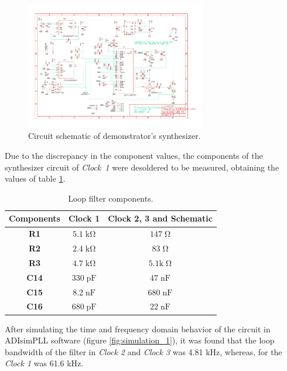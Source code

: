 \documentclass[a4paper,12pt]{article}
\begin{document}
\begin{figure}[!h]
    \centering
    \includegraphics[width=0.7\textwidth]{Images/Frequency_synthesizer_v1.0.sch.pdf}
    \captionsetup{justification=centering}
    \caption{Circuit schematic of demonstrator's synthesizer.} 
    \label{fig:sch_synth}
\end{figure}

Due to the discrepancy in the component values, the components of the synthesizer circuit of \mbox{\textit{Clock 1}} were desoldered to be measured, obtaining the values of table \ref{table:components}.

\begin{table}[!h]
\centering
\begin{tabular}{|c|c|c|}
\hline
\textbf{Components}    & \textbf{Clock 1}           & \textbf{Clock 2, 3 and Schematic} \\ \hline
\textbf{R1}  & $5.1\; \mathrm{k\Omega}$ & $147\; \mathrm{\Omega}$        \\ \hline
\textbf{R2}  & $2.4\; \mathrm{k\Omega}$ & $83\; \mathrm{\Omega}$         \\ \hline
\textbf{R3}  & $4.7\; \mathrm{k\Omega}$ & $5.1 \mathrm{k\; \Omega}$      \\ \hline
\textbf{C14} & $330\; \mathrm{pF}$                     & $47\; \mathrm{nF}$                            \\ \hline
\textbf{C15} & $8.2\; \mathrm{nF}$                     & $680\; \mathrm{nF}$                           \\ \hline
\textbf{C16} & $680\; \mathrm{pF}$                     & $22\; \mathrm{nF}$                            \\ \hline
\end{tabular}
\caption{Loop filter components.}
\label{table:components}
\end{table}

After simulating the time and frequency domain behavior of the circuit in ADIsimPLL software (figure \ref{fig:simulation_1}), it was found that the loop bandwidth of the filter in \textit{Clock 2} and \textit{Clock 3} was 4.81 kHz, whereas, for the \textit{Clock 1} was 61.6 kHz. 
\end{document}

